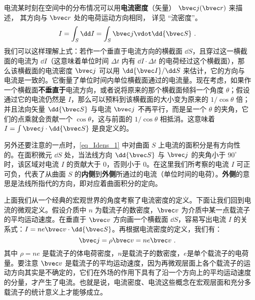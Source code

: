 

电流某时刻在空间中的分布情况可以用\textbf{电流密度}（矢量） $\bvec j(\bvec r)$ 来描述， 其方向与 $\bvec r$ 处的电荷运动方向相同， 详见 “流密度”。
\begin{equation}\label{eq_Idens_1}
I = \int_S \dd I= \int_S \bvec j \vdot \dd{\bvec S}~.
\end{equation}
我们可以这样理解上式：若作一个垂直于电流方向的横截面 $\dd S$，且穿过这一横截面的电流为 $\dd I$（这意味着单位时间 $\Delta t$ 内有 $\dd I\cdot \Delta t$ 的电荷经过这个横截面），那么该横截面的电流密度 $\bvec j$ 可以用 $\dd{\bvec I}/\dd S$ 来估计，它的方向与电流是一致的。它衡量了单位时间内单位横截面通过的电流量。现在考虑，如果作一个横截面\textbf{不垂直于}电流方向，或者说将原来的那个横截面倾斜一个角度 $\theta$；假设通过它的电流仍然是 $I$，那么可以预料到该横截面的大小变为原来的 $1/\cos\theta$ 倍；并且法向矢量 $\dd{\bvec S}$ 与电流 $\bvec j$ 不再平行，而是呈一个 $\theta$ 的夹角，它们的点乘就会贡献一个 $\cos\theta$，这与前面的 $1/\cos\theta$ 相抵消。这意味着 $I=\int \bvec j\cdot \dd{\bvec S}$ 是良定义的。

另外还要注意的一点时，\autoref{eq_Idens_1} 中对曲面 $S$ 上电流的面积分是有方向性的。在面积微元 $\dd S$ 处，当法线方向 $\dd{\bvec S}$ 与 $\bvec j$ 的夹角小于 $90^\circ$ 时，该区域对电流 $I$ 的贡献大于 $0$，否则小于 $0$。在这里我们所考察的电流 $I$ 可正可负，代表了从曲面 $S$ 的\textbf{内侧}到\textbf{外侧}所通过的电流（单位时间的电荷）。\textbf{外侧}的意思是法线所指代的方向，即对应着曲面积分的定向。

上面我们从一个经典的宏观世界的角度考察了电流密度的定义。下面让我们回到电流的微观定义。假设介质中 $n$ 为载流子的数密度，$\bvec v$ 为介质中某一点载流子的平均运动速度。在垂直于 $\bvec v$ 方向画一个横截面 $\dd S$，容易写出电流 $I$ 的关系式：$I=ne\bvec v \cdot \dd{\bvec S}$。再根据电流密度的定义，我们有：
\begin{equation}
\bvec j = \rho \bvec v = ne \bvec v~.
\end{equation}
其中 $\rho=ne$ 是载流子的体电荷密度，$n$是载流子的数密度，$e$是单个载流子的电荷量。要注意 $\bvec v$ 是载流子的平均运动速度，因为再微观层面上各个载流子的运动方向其实是不确定的，它们在外场的作用下具有了沿一个方向上的平均运动速度的分量，才产生了电流。也就是说，电流密度、电流这些概念在宏观层面和充分多载流子的统计意义上才能够成立\cite{GriffE}。
